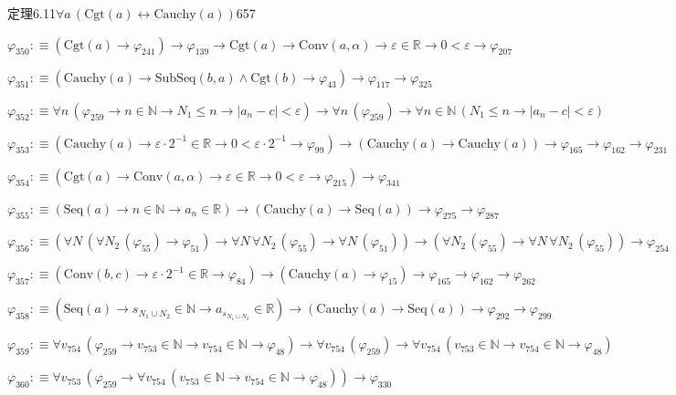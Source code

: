 \begin{fullproof}{定理6.11}{$\forall a\,(\mathrm{Cgt}(a) \leftrightarrow \mathrm{Cauchy}(a))$}{657}
\begin{abbrevlist}
\item $\varphi_{350} :\equiv (\mathrm{Cgt}(a) \to \varphi_{241}) \to \varphi_{139} \to \mathrm{Cgt}(a) \to \mathrm{Conv}(a,\alpha) \to \varepsilon \in \mathbb{R} \to 0 < \varepsilon \to \varphi_{207}$
\item $\varphi_{351} :\equiv (\mathrm{Cauchy}(a) \to \mathrm{SubSeq}(b,a) \land \mathrm{Cgt}(b) \to \varphi_{43}) \to \varphi_{117} \to \varphi_{325}$
\item $\varphi_{352} :\equiv \forall n\,(\varphi_{259} \to n \in \mathbb{N} \to N_{1} \leq n \to \lvert a_{n} - c \rvert < \varepsilon) \to \forall n\,(\varphi_{259}) \to \forall n \in \mathbb{N}\,(N_{1} \leq n \to \lvert a_{n} - c \rvert < \varepsilon)$
\item $\varphi_{353} :\equiv (\mathrm{Cauchy}(a) \to \varepsilon \cdot 2^{-1} \in \mathbb{R} \to 0 < \varepsilon \cdot 2^{-1} \to \varphi_{99}) \to (\mathrm{Cauchy}(a) \to \mathrm{Cauchy}(a)) \to \varphi_{165} \to \varphi_{162} \to \varphi_{231}$
\item $\varphi_{354} :\equiv (\mathrm{Cgt}(a) \to \mathrm{Conv}(a,\alpha) \to \varepsilon \in \mathbb{R} \to 0 < \varepsilon \to \varphi_{215}) \to \varphi_{341}$
\item $\varphi_{355} :\equiv (\mathrm{Seq}(a) \to n \in \mathbb{N} \to a_{n} \in \mathbb{R}) \to (\mathrm{Cauchy}(a) \to \mathrm{Seq}(a)) \to \varphi_{275} \to \varphi_{287}$
\item $\varphi_{356} :\equiv (\forall N\,(\forall N_{2}\,(\varphi_{55}) \to \varphi_{51}) \to \forall N\,\forall N_{2}\,(\varphi_{55}) \to \forall N\,(\varphi_{51})) \to (\forall N_{2}\,(\varphi_{55}) \to \forall N\,\forall N_{2}\,(\varphi_{55})) \to \varphi_{254}$
\item $\varphi_{357} :\equiv (\mathrm{Conv}(b,c) \to \varepsilon \cdot 2^{-1} \in \mathbb{R} \to \varphi_{84}) \to (\mathrm{Cauchy}(a) \to \varphi_{15}) \to \varphi_{165} \to \varphi_{162} \to \varphi_{262}$
\item $\varphi_{358} :\equiv (\mathrm{Seq}(a) \to s_{N_{1} \cup N_{2}} \in \mathbb{N} \to a_{s_{N_{1} \cup N_{2}}} \in \mathbb{R}) \to (\mathrm{Cauchy}(a) \to \mathrm{Seq}(a)) \to \varphi_{292} \to \varphi_{299}$
\item $\varphi_{359} :\equiv \forall v_{754}\,(\varphi_{259} \to v_{753} \in \mathbb{N} \to v_{754} \in \mathbb{N} \to \varphi_{48}) \to \forall v_{754}\,(\varphi_{259}) \to \forall v_{754}\,(v_{753} \in \mathbb{N} \to v_{754} \in \mathbb{N} \to \varphi_{48})$
\item $\varphi_{360} :\equiv \forall v_{753}\,(\varphi_{259} \to \forall v_{754}\,(v_{753} \in \mathbb{N} \to v_{754} \in \mathbb{N} \to \varphi_{48})) \to \varphi_{330}$

\end{abbrevlist}
\end{fullproof}
